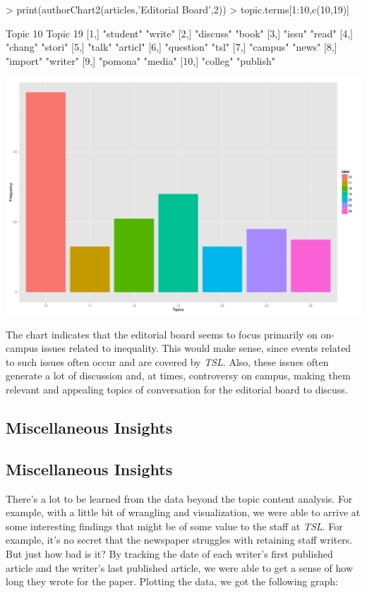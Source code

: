\documentclass[a4paper]{article}
\begin{document}
\begin{Schunk}
\begin{Sinput}
> print(authorChart2(articles,'Editorial Board',2))
> topic.terms[1:10,c(10,19)]
\end{Sinput}
\begin{Soutput}
      Topic 10   Topic 19 
 [1,] "student"  "write"  
 [2,] "discuss"  "book"   
 [3,] "issu"     "read"   
 [4,] "chang"    "stori"  
 [5,] "talk"     "articl" 
 [6,] "question" "tsl"    
 [7,] "campus"   "news"   
 [8,] "import"   "writer" 
 [9,] "pomona"   "media"  
[10,] "colleg"   "publish"
\end{Soutput}
\end{Schunk}
\includegraphics{FinalProject-012}

The chart indicates that the editorial board seems to focus primarily on on-campus issues related to inequality. This would make sense, since events related to such issues often occur and are covered by \textit{TSL}. Also, these issues often generate a lot of discussion and, at times, controversy on campus, making them relevant and appealing topics of conversation for the editorial board to discuss.

\subsection{Miscellaneous Insights}


\subsection{Miscellaneous Insights}


There's a lot to be learned from the data beyond the topic content analysis. For example, with a little bit of wrangling and visualization, we were able to arrive at some interesting findings that might be of some value to the staff at \textit{TSL}. For example, it's no secret that the newspaper struggles with retaining staff writers. But just how bad is it? By tracking the date of each writer's first published article and the writer's last published article, we were able to get a sense of how long they wrote for the paper. Plotting the data, we got the following graph:
\end{document}
